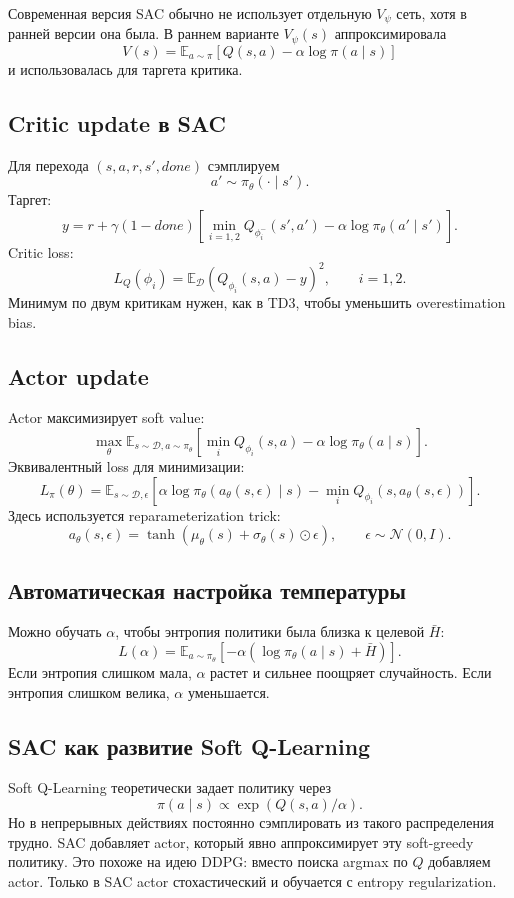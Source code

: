 \documentclass[11pt,a4paper]{article}
\newcommand{\E}{\mathbb{E}}
\newcommand{\1}{\mathbf{1}}
\newcommand{\cD}{\mathcal D}
\begin{document}
Современная версия SAC обычно не использует отдельную $V_\psi$ сеть, хотя в ранней версии она была. В раннем варианте $V_\psi(s)$ аппроксимировала
\[
    V(s)=\E_{a\sim\pi}\left[Q(s,a)-\alpha\log\pi(a\mid s)\right]
\]
и использовалась для таргета критика.

\subsection*{Critic update в SAC}
Для перехода $(s,a,r,s',done)$ сэмплируем
\[
    a'\sim\pi_\theta(\cdot\mid s').
\]
Таргет:
\[
    y=r+\gamma(1-done)\left[
    \min_{i=1,2}Q_{\phi_i^-}(s',a')-
    \alpha\log\pi_\theta(a'\mid s')
    \right].
\]
Critic loss:
\[
    L_Q(\phi_i)=\E_{\cD}\left(Q_{\phi_i}(s,a)-y\right)^2,
    \qquad i=1,2.
\]
Минимум по двум критикам нужен, как в TD3, чтобы уменьшить overestimation bias.

\subsection*{Actor update}
Actor максимизирует soft value:
\[
    \max_\theta \E_{s\sim\cD,a\sim\pi_\theta}\left[
    \min_iQ_{\phi_i}(s,a)-\alpha\log\pi_\theta(a\mid s)
    \right].
\]
Эквивалентный loss для минимизации:
\[
    L_\pi(\theta)=\E_{s\sim\cD,\epsilon}\left[
    \alpha\log\pi_\theta(a_\theta(s,
    \epsilon)\mid s)-\min_iQ_{\phi_i}(s,a_\theta(s,\epsilon))
    \right].
\]
Здесь используется reparameterization trick:
\[
    a_\theta(s,\epsilon)=\tanh(\mu_\theta(s)+\sigma_\theta(s)\odot\epsilon),
    \qquad \epsilon\sim\mathcal N(0,I).
\]

\subsection*{Автоматическая настройка температуры}
Можно обучать $\alpha$, чтобы энтропия политики была близка к целевой $\bar H$:
\[
    L(\alpha)=\E_{a\sim\pi_\theta}\left[-\alpha(\log\pi_\theta(a\mid s)+\bar H)\right].
\]
Если энтропия слишком мала, $\alpha$ растет и сильнее поощряет случайность. Если энтропия слишком велика, $\alpha$ уменьшается.

\subsection*{SAC как развитие Soft Q-Learning}
Soft Q-Learning теоретически задает политику через
\[
    \pi(a\mid s)\propto\exp(Q(s,a)/\alpha).
\]
Но в непрерывных действиях постоянно сэмплировать из такого распределения трудно. SAC добавляет actor, который явно аппроксимирует эту soft-greedy политику. Это похоже на идею DDPG: вместо поиска argmax по $Q$ добавляем actor. Только в SAC actor стохастический и обучается с entropy regularization.
\end{document}
